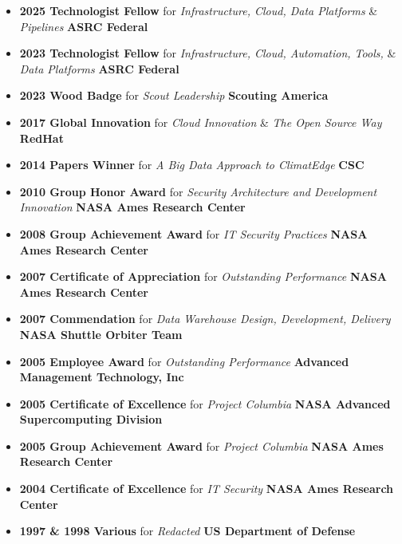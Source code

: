 \begin{itemize}
	\parskip=0.1em
	\item
	\headerrow
		{\textbf{2025 Technologist Fellow} for {\emph{Infrastructure, Cloud, Data Platforms}} \& {\emph{Pipelines}}}
		{\textbf{ASRC Federal}}
	\item
	\headerrow
		{\textbf{2023 Technologist Fellow} for {\emph{Infrastructure, Cloud, Automation, Tools,}} \& {\emph{Data Platforms}}}
		{\textbf{ASRC Federal}}
  	\item
  	\headerrow
  		{\textbf{2023 Wood Badge} for {\emph{Scout Leadership}}}
  		{\textbf{Scouting America}}
    \item
	\headerrow
		{\textbf{2017 Global Innovation} for {\emph{Cloud Innovation}} \& {\emph{The Open Source Way}}}
		{\textbf{RedHat}}
  \item
	\headerrow
		{\textbf{2014 Papers Winner} for {\emph{A Big Data Approach to ClimatEdge\texttrademark}}}
		{\textbf{CSC}}

	\item
	\headerrow
		{\textbf{2010 Group Honor Award} for {\emph{Security Architecture and Development Innovation}}}
		{\textbf{NASA Ames Research Center}}

	\item
	\headerrow
		{\textbf{2008 Group Achievement Award} for {\emph{IT Security Practices}} }
		{\textbf{NASA Ames Research Center}}

	\item
	\headerrow
		{\textbf{2007 Certificate of Appreciation} for {\emph{Outstanding Performance}}}
		{\textbf{NASA Ames Research Center}}

	\item
	\headerrow
		{\textbf{2007 Commendation} for {\emph{Data Warehouse Design, Development, Delivery}} }
		{\textbf{NASA Shuttle Orbiter Team}}

	\item
	\headerrow
		{\textbf{2005 Employee Award} for {\emph{Outstanding Performance}} }
		{\textbf{Advanced Management Technology, Inc}}

	\item
	\headerrow
		{\textbf{2005 Certificate of Excellence} for {\emph{Project Columbia}}}
		{\textbf{NASA Advanced Supercomputing Division}}

	\item
	\headerrow
		{\textbf{2005 Group Achievement Award} for {\emph{Project Columbia}}}
		{\textbf{NASA Ames Research Center}}

	\item
	\headerrow
		{\textbf{2004 Certificate of Excellence} for {\emph{IT Security}}}
		{\textbf{NASA Ames Research Center}}

	\item
	\headerrow
		{\textbf{1997 \& 1998 Various} for {\emph{Redacted}}}
		{\textbf{US Department of Defense}}

\end{itemize}


